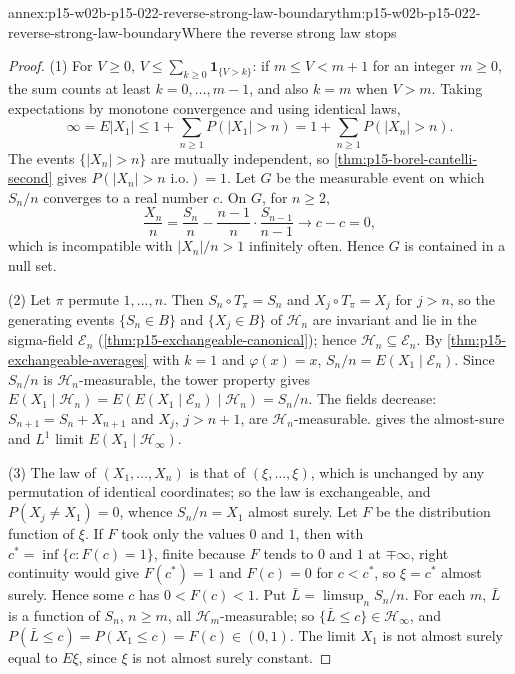 \begin{annexitem}{annex:p15-w02b-p15-022-reverse-strong-law-boundary}{thm:p15-w02b-p15-022-reverse-strong-law-boundary}{Where the reverse strong law stops}
\begin{proof}
(1) For \(V\geq0\), \(V\leq\sum_{k\geq0}\mathbf1_{\{V>k\}}\): if
\(m\leq V<m+1\) for an integer \(m\geq0\), the sum counts at least
\(k=0,\ldots,m-1\), and also \(k=m\) when \(V>m\). Taking expectations by
monotone convergence and using identical laws,
\[
 \infty=E|X_1|\leq1+\sum_{n\geq1}P(|X_1|>n)=1+\sum_{n\geq1}P(|X_n|>n).
\]
The events \(\{|X_n|>n\}\) are mutually independent, so
\cref{thm:p15-borel-cantelli-second} gives \(P(|X_n|>n\text{ i.o.})=1\).
Let \(G\) be the measurable event on which \(S_n/n\) converges to a real
number \(c\). On \(G\), for \(n\geq2\),
\[
 \frac{X_n}{n}=\frac{S_n}{n}-\frac{n-1}{n}\cdot\frac{S_{n-1}}{n-1}
   \longrightarrow c-c=0,
\]
which is incompatible with \(|X_n|/n>1\) infinitely often. Hence
\(G\) is contained in a null set.

(2) Let \(\pi\) permute \(1,\ldots,n\). Then \(S_n\circ T_\pi=S_n\) and
\(X_j\circ T_\pi=X_j\) for \(j>n\), so the generating events
\(\{S_n\in B\}\) and \(\{X_j\in B\}\) of \(\mathcal H_n\) are invariant
and lie in the sigma-field \(\mathcal E_n\)
(\cref{thm:p15-exchangeable-canonical}); hence
\(\mathcal H_n\subseteq\mathcal E_n\). By
\cref{thm:p15-exchangeable-averages} with \(k=1\) and \(\varphi(x)=x\),
\(S_n/n=E(X_1\mid\mathcal E_n)\). Since \(S_n/n\) is
\(\mathcal H_n\)-measurable, the tower property gives
\(E(X_1\mid\mathcal H_n)=E(E(X_1\mid\mathcal E_n)\mid\mathcal H_n)=S_n/n\).
The fields decrease: \(S_{n+1}=S_n+X_{n+1}\) and \(X_j\), \(j>n+1\), are
\(\mathcal H_n\)-measurable.  gives the
almost-sure and \(L^1\) limit \(E(X_1\mid\mathcal H_\infty)\).

(3) The law of \((X_1,\ldots,X_n)\) is that of \((\xi,\ldots,\xi)\), which is
unchanged by any permutation of identical coordinates; so the law is
exchangeable, and \(P(X_j\neq X_1)=0\), whence \(S_n/n=X_1\) almost surely.
Let \(F\) be the distribution function of \(\xi\). If \(F\) took only the
values \(0\) and \(1\), then with \(c^*=\inf\{c:F(c)=1\}\), finite because
\(F\) tends to \(0\) and \(1\) at \(\mp\infty\), right continuity would give
\(F(c^*)=1\) and \(F(c)=0\) for \(c<c^*\), so \(\xi=c^*\) almost surely.
Hence some \(c\) has \(0<F(c)<1\). Put \(\bar L=\limsup_nS_n/n\). For each
\(m\), \(\bar L\) is a function of \(S_n\), \(n\geq m\), all
\(\mathcal H_m\)-measurable; so \(\{\bar L\leq c\}\in\mathcal H_\infty\),
and \(P(\bar L\leq c)=P(X_1\leq c)=F(c)\in(0,1)\). The limit \(X_1\)
is not almost surely equal to \(E\xi\), since \(\xi\) is not almost surely
constant.
\end{proof}
\end{annexitem}

